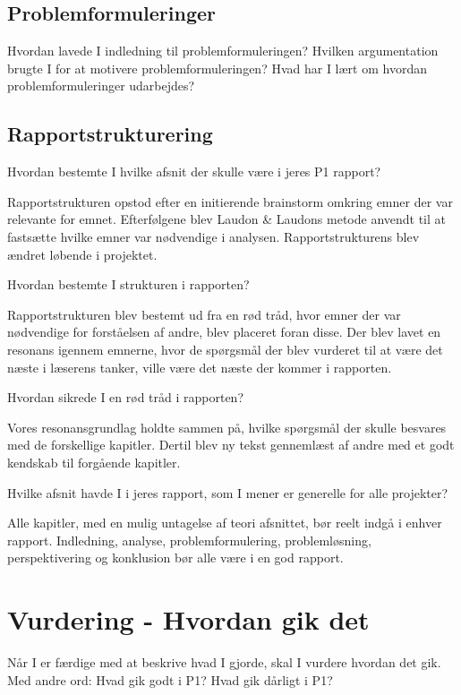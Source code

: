 \documentclass[a4paper,12pt,twoside,openright]{memoir}
\begin{document}
        

        \subsection{Problemformuleringer}
        Hvordan lavede I indledning til problemformuleringen?
        Hvilken argumentation brugte I for at motivere problemformuleringen?
        Hvad har I lært om hvordan problemformuleringer udarbejdes?

        \subsection{Rapportstrukturering}
        Hvordan bestemte I hvilke afsnit der skulle være i jeres P1 rapport?

        Rapportstrukturen opstod efter en initierende brainstorm omkring emner der var relevante for emnet. Efterfølgene blev Laudon \& Laudons metode anvendt til at fastsætte hvilke emner var nødvendige i analysen. Rapportstrukturens blev ændret løbende i projektet.

        Hvordan bestemte I strukturen i rapporten?

        Rapportstrukturen blev bestemt ud fra en rød tråd, hvor emner der var nødvendige for forståelsen af andre, blev placeret foran disse. Der blev lavet en resonans igennem emnerne, hvor de spørgsmål der blev vurderet til at være det næste i læserens tanker, ville være det næste der kommer i rapporten.

        Hvordan sikrede I en rød tråd i rapporten?

        Vores resonansgrundlag holdte sammen på, hvilke spørgsmål der skulle besvares med de forskellige kapitler. Dertil blev ny tekst gennemlæst af andre med et godt kendskab til forgående kapitler.

        Hvilke afsnit havde I i jeres rapport, som I mener er generelle for alle projekter?

        Alle kapitler, med en mulig untagelse af teori afsnittet, bør reelt indgå i enhver rapport. Indledning, analyse, problemformulering, problemløsning, perspektivering og konklusion bør alle være i en god rapport.

    \section{Vurdering - Hvordan gik det}
    Når I er færdige med at beskrive hvad I gjorde, skal I vurdere hvordan det gik. Med andre ord: Hvad gik godt i P1? Hvad gik dårligt i P1? 
\end{document}

